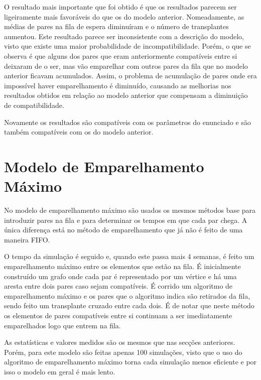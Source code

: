 \documentclass[10pt,a4paper,oneside]{article}
\begin{document}
O resultado mais importante que foi obtido é que os resultados parecem
ser ligeiramente mais favoráveis do que os do modelo
anterior. Nomeadamente, as médias de pares na fila de espera
diminuíram e o número de transplantes aumentou. Este resultado parece
ser inconsistente com a descrição do modelo, visto que existe uma
maior probabilidade de incompatibilidade. Porém, o que se observa é
que alguns dos pares que eram anteriormente compatíveis entre si
deixaram de o ser, mas vão emparelhar com outros pares da fila que no
modelo anterior ficavam acumulados. Assim, o problema de acumulação de
pares onde era impossível haver emparelhamento é diminuído, causando
as melhorias nos resultados obtidos em relação ao modelo anterior que
compensam a diminuição de compatibilidade.

Novamente os resultados são compatíveis com os parâmetros do enunciado
e são também compatíveis com os do modelo anterior.


\section{Modelo de Emparelhamento Máximo}
\label{sec:model3}

No modelo de emparelhamento máximo são usados os mesmos métodos base
para introduzir pares na fila e para determinar os tempos em que cada
par chega. A única diferença está no método de emparelhamento que já
não é feito de uma maneira FIFO.

O tempo da simulação é seguido e, quando este passa mais 4 semanas, é
feito um emparelhamento máximo entre os elementos que estão na fila. É
inicialmente construído um grafo onde cada par é representado por um
vértice e há uma aresta entre dois pares caso sejam compatíveis. É
corrido um algoritmo de emparelhamento máximo e os pares que o
algoritmo indica são retirados da fila, sendo feito um transplante
cruzado entre cada dois. É de notar que neste método os elementos de
pares compatíveis entre si continuam a ser imediatamente emparelhados
logo que entrem na fila.

As estatísticas e valores medidos são os mesmos que nas secções
anteriores. Porém, para este modelo são feitas apenas 100 simulações,
visto que o uso do algoritmo de emparelhamento máximo torna cada
simulação menos eficiente e por isso o modelo em geral é mais lento.
\end{document}
